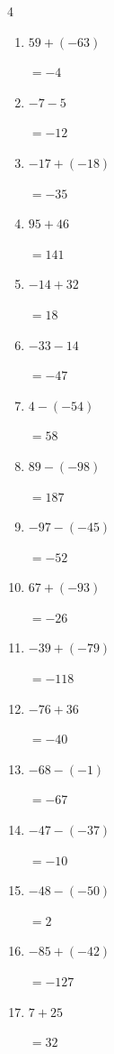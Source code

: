 \begin{multicols}{4}
\begin{enumerate}
  \item $59+(-63)$

        $=-4$

  \item $-7-5$

        $=-12$

  \item $-17+(-18)$

        $=-35$

  \item $95+46$

        $=141$

  \item $-14+32$

        $=18$

  \item $-33-14$

        $=-47$

  \item $4-(-54)$

        $=58$

  \item $89-(-98)$

        $=187$

  \item $-97-(-45)$

        $=-52$

  \item $67+(-93)$

        $=-26$

  \item $-39+(-79)$

        $=-118$

  \item $-76+36$

        $=-40$

  \item $-68-(-1)$

        $=-67$

  \item $-47-(-37)$

        $=-10$

  \item $-48-(-50)$

        $=2$

  \item $-85+(-42)$

        $=-127$

  \item $7+25$

        $=32$


\end{enumerate}
\end{multicols}
